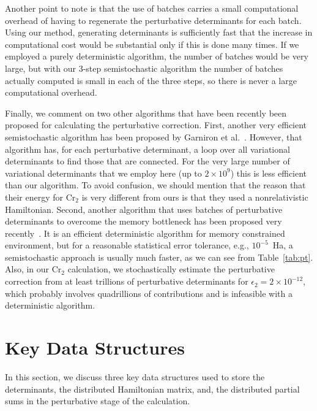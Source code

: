 \documentclass[%
reprint,
 superscriptaddress,
 amsmath,amssymb,
 aps,
]{revtex4-1}
\begin{document}
Another point to note is that the use of batches carries a small computational overhead of having to regenerate the
perturbative determinants for each batch.  Using our method, generating determinants is sufficiently fast that the
increase in computational cost would be substantial only if this is done many times.  If we employed a purely
deterministic algorithm, the number of batches would be very large, but with our 3-step semistochastic algorithm
the number of batches actually computed is small in each of the three steps, so there is never a large computational overhead.

Finally, we comment on two other algorithms that have been recently been proposed for calculating the perturbative correction.
First, another very efficient semistochastic algorithm has been proposed
by Garniron et al.~\cite{GarSceLooCaf-JCP-17}.  However, that algorithm has, for each perturbative determinant, a loop over all variational determinants to find those that are connected.  For the very large number of variational determinants that we employ
here (up to $2 \times 10^9$) this is less efficient than our algorithm.
To avoid confusion, we should mention that the reason that their energy for Cr$_2$ is very different from ours is
that they used a nonrelativistic Hamiltonian.
Second, another algorithm that uses batches of perturbative determinants to overcome the memory bottleneck has been proposed
very recently~\cite{TubLevHaiHeaWha-ARX-18}.
It is an efficient deterministic algorithm for memory constrained environment, but for a reasonable statistical error tolerance, e.g., $10^{-5}$~Ha, a semistochastic approach is usually much faster, as we can see from Table~\ref{tab:pt}.
Also, in our Cr$_2$ calculation, we stochastically estimate the perturbative correction from at least trillions of perturbative determinants for $\epsilon_2=2\times10^{-12}$, which probably involves quadrillions of contributions and is infeasible with a deterministic algorithm.


\section{Key Data Structures}
\label{key}
In this section, we discuss three key data structures used to store the determinants, the distributed Hamiltonian matrix, and,
the distributed partial sums in the perturbative stage of the calculation.
\end{document}
